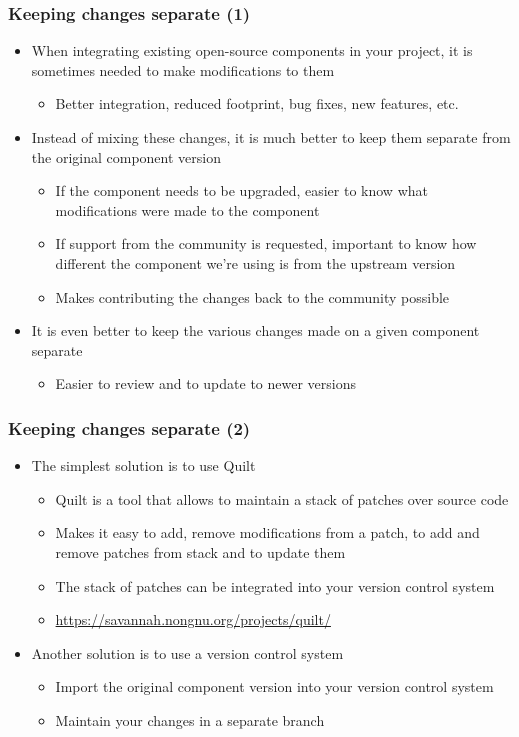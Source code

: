 \begin{frame}
  \frametitle{Keeping changes separate (1)}
  \begin{itemize}
  \item When integrating existing open-source components in your
    project, it is sometimes needed to make modifications to them
    \begin{itemize}
    \item Better integration, reduced footprint, bug fixes, new
      features, etc.
    \end{itemize}
  \item Instead of mixing these changes, it is much better to keep
    them separate from the original component version
    \begin{itemize}
    \item If the component needs to be upgraded, easier to know what
      modifications were made to the component
    \item If support from the community is requested, important to
      know how different the component we're using is from the
      upstream version
    \item Makes contributing the changes back to the community
      possible
    \end{itemize}
  \item It is even better to keep the various changes made on a given
    component separate
    \begin{itemize}
    \item Easier to review and to update to newer versions
    \end{itemize}
  \end{itemize}
\end{frame}

\begin{frame}
  \frametitle{Keeping changes separate (2)}
  \begin{itemize}
  \item The simplest solution is to use Quilt
    \begin{itemize}
    \item Quilt is a tool that allows to maintain a stack of patches
      over source code
    \item Makes it easy to add, remove modifications from a patch, to
      add and remove patches from stack and to update them
    \item The stack of patches can be integrated into your version
      control system
    \item \url{https://savannah.nongnu.org/projects/quilt/}
    \end{itemize}
  \item Another solution is to use a version control system
    \begin{itemize}
    \item Import the original component version into your version
      control system
    \item Maintain your changes in a separate branch
    \end{itemize}
  \end{itemize}
\end{frame}


